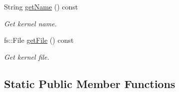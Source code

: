 \begin{DoxyCompactItemize}
String \hyperlink{classlibrary_1_1physics_1_1env_1_1ephem_1_1spice_1_1_kernel_a18a26cbbb0532f2f7f4e7d03ac7a0afd}{get\+Name} () const
\begin{DoxyCompactList}\small\item\em Get kernel name. \end{DoxyCompactList}\item 
fs\+::\+File \hyperlink{classlibrary_1_1physics_1_1env_1_1ephem_1_1spice_1_1_kernel_a5e0166f77d89de5af6279d465a5c22ca}{get\+File} () const
\begin{DoxyCompactList}\small\item\em Get kernel file. \end{DoxyCompactList}\end{DoxyCompactItemize}
\subsection*{Static Public Member Functions}
